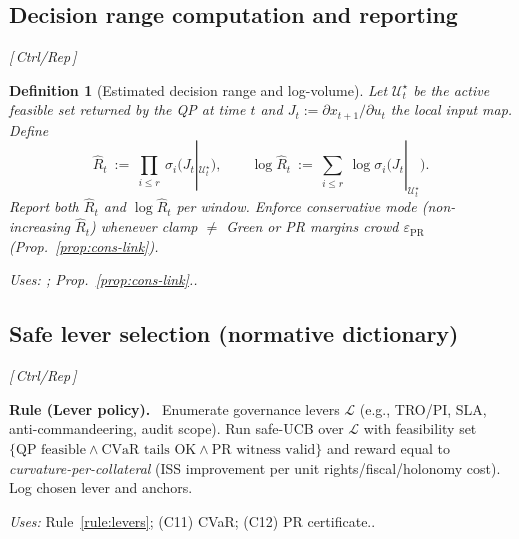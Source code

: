 \documentclass[10pt]{article}
\makeatletter
\newenvironment{rulex}[1]{\begin{rulebox}\noindent\textbf{Rule (#1).}\ }{\end{rulebox}}
\newcommand{\uses}[1]{\par\smallskip\noindent\textit{Uses: }#1.\par\smallskip}
\newcommand{\layertag}[1]{\textsf{\footnotesize[\,#1\,]}}
\newcommand{\JSGxref}[2]{%
  \@ifundefined{r@#2}{\textbf{[#1 ??]}}{#1~\ref{#2}}}
\newcommand{\secref}[1]{\JSGxref{§}{#1}}
\providecommand{\constsymPRmargin}{\varepsilon_{\mathrm{PR}}}
\newtheorem{definition}{Definition}
\makeatother
\begin{document}
\subsection{Decision range computation and reporting}\label{subsec:range}
\emph{\layertag{Ctrl/Rep}}

\begin{definition}[Estimated decision range and log-volume]\label{def:range}
Let $\mathcal U^\star_t$ be the active feasible set returned by the QP at time $t$ and $J_t:=\partial x_{t+1}/\partial u_t$ the local input map. Define
\[
\hat R_t\ :=\ \prod_{i\le r}\ \sigma_i\big(J_t|_{\mathcal U^\star_t}\big),\qquad
\log \hat R_t\ :=\ \sum_{i\le r}\ \log \sigma_i\big(J_t|_{\mathcal U^\star_t}\big).
\]
Report both $\hat R_t$ and $\log \hat R_t$ per window. Enforce \emph{conservative mode} (non-increasing $\hat R_t$) whenever clamp $\neq$ Green or PR margins crowd $\constsymPRmargin$ (Prop.~\ref{prop:cons-link}).
\uses{\secref{subsec:ops-kpis}; Prop.~\ref{prop:cons-link}.}
\end{definition}

\subsection{Safe lever selection (normative dictionary)}\label{subsec:levers}
\emph{\layertag{Ctrl/Rep}}

\begin{rulex}{Lever policy}\label{rule:lever-policy}
Enumerate governance levers $\mathcal L$ (e.g., TRO/PI, SLA, anti-commandeering, audit scope). Run safe-UCB over $\mathcal L$ with feasibility set
\(
\{\text{QP feasible} \wedge \text{CVaR tails OK} \wedge \text{PR witness valid}\}
\)
and reward equal to \emph{curvature-per-collateral} (ISS improvement per unit rights/fiscal/holonomy cost). Log chosen lever and anchors.
\uses{Rule~\ref{rule:levers}; (C11) CVaR; (C12) PR certificate.}
\end{rulex}
\end{document}
